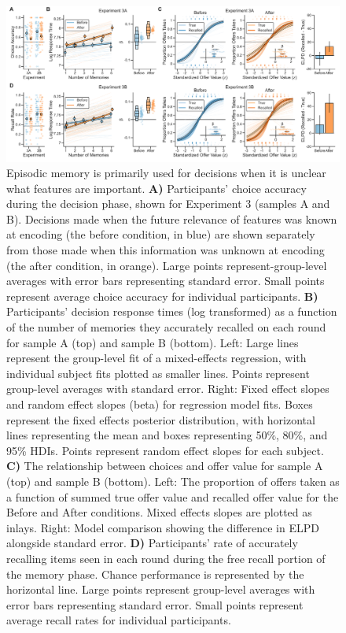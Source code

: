 \documentclass[10pt,letterpaper]{article}
\begin{document}
\begin{figure}[t]
    \centering
    \includegraphics[width=1\textwidth]{figures/Figure3.pdf}
    \caption{Episodic memory is primarily used for decisions when it is unclear what features are important. \textbf{A)} Participants' choice accuracy during the decision phase, shown for Experiment 3 (samples A and B). Decisions made when the future relevance of features was known at encoding (the before condition, in blue) are shown separately from those made when this information was unknown at encoding (the after condition, in orange). Large points represent-group-level averages with error bars representing standard error. Small points represent average choice accuracy for individual participants. \textbf{B)} Participants' decision response times (log transformed) as a function of the number of memories they accurately recalled on each round for sample A (top) and sample B (bottom). Left: Large lines represent the group-level fit of a mixed-effects regression, with individual subject fits plotted as smaller lines. Points represent group-level averages with standard error. Right: Fixed effect slopes and random effect slopes (beta) for regression model fits. Boxes represent the fixed effects posterior distribution, with horizontal lines representing the mean and boxes representing 50\%, 80\%, and 95\% HDIs. Points represent random effect slopes for each subject. \textbf{C)} The relationship between choices and offer value for sample A (top) and sample B (bottom). Left: The proportion of offers taken as a function of summed true offer value and recalled offer value for the Before and After conditions. Mixed effects slopes are plotted as inlays. Right: Model comparison showing the difference in ELPD alongside standard error. \textbf{D)} Participants' rate of accurately recalling items seen in each round during the free recall portion of the memory phase. Chance performance is represented by the horizontal line. Large points represent group-level averages with error bars representing standard error. Small points represent average recall rates for individual participants.}
    \label{fig:figure3}
\end{figure}
\end{document}
